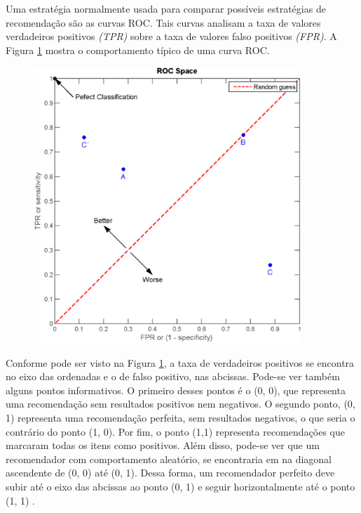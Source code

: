 Uma estratégia normalmente usada para comparar possíveis estratégias de
recomendação são as curvas ROC. Tais curvas analisam a taxa de valores
verdadeiros positivos \textit{(TPR)} sobre a taxa de valores falso
positivos \textit{(FPR)}. A Figura
\ref{fig:curva_roc} mostra o comportamento típico de uma curva ROC.

\begin{figure}[h]
  \centering
  \includegraphics[width=0.9\textwidth]{figuras/curva_roc.eps}
  \caption{}
  \label{fig:curva_roc}
\end{figure}

Conforme pode ser visto na Figura \ref{fig:curva_roc}, a taxa de verdadeiros
positivos se encontra no eixo das ordenadas e o de falso positivo, nas
abcissas. Pode-se ver também alguns pontos informativos. O primeiro desses
pontos é o (0, 0), que representa uma recomendação sem resultados positivos nem
negativos. O segundo ponto, (0, 1) representa uma recomendação perfeita, sem
resultados negativos, o que seria o contrário do ponto (1, 0). Por fim, o ponto
(1,1) representa recomendações que marcaram todas os itens como positivos. Além
disso, pode-se ver que um recomendador com comportamento aleatório, se
encontraria em na diagonal ascendente de (0, 0) até (0, 1). Dessa forma, um
recomendador perfeito deve subir até o eixo das abcissas ao ponto (0, 1) e
seguir horizontalmente até o ponto (1, 1) \cite{araujo2011apprecommender}.

